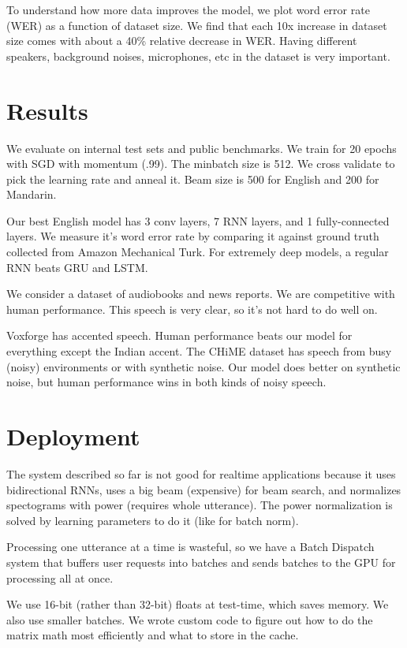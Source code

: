 \documentclass[a4paper]{article}
\begin{document}
To understand how more data improves the model, we plot word error rate (WER)
as a function of dataset size. We find that each 10x increase in dataset size
comes with about a 40\% relative decrease in WER. Having different speakers,
background noises, microphones, etc in the dataset is very important.

\section{Results}
We evaluate on internal test sets and public benchmarks. We train for 20
epochs with SGD with momentum (.99). The minbatch size is 512. We cross validate
to pick the learning rate and anneal it. Beam size is 500 for English and 200
for Mandarin.

Our best English model has 3 conv layers, 7 RNN layers, and 1 fully-connected
layers. We measure it's word error rate by comparing it against ground truth
collected from Amazon Mechanical Turk. For extremely deep models, a regular
RNN beats GRU and LSTM.

We consider a dataset of audiobooks and news reports. We are competitive with
human performance. This speech is very clear, so it's not hard to do well on.

Voxforge has accented speech. Human performance beats our model for everything
except the Indian accent. The CHiME dataset has speech from busy (noisy)
environments or with synthetic noise. Our model does better on synthetic noise,
but human performance wins in both kinds of noisy speech.

\section{Deployment}
The system described so far is not good for realtime applications because
it uses bidirectional RNNs, uses a big beam (expensive) for beam search, and
normalizes spectograms with power (requires whole utterance). The power
normalization is solved by learning parameters to do it (like for batch
norm).

Processing one utterance at a time is wasteful, so we have a Batch Dispatch
system that buffers user requests into batches and sends batches to the
GPU for processing all at once.

We use 16-bit (rather than 32-bit) floats at test-time, which saves memory. We
also use smaller batches. We wrote custom code to figure out how to do the
matrix math most efficiently and what to store in the cache.
\end{document}
